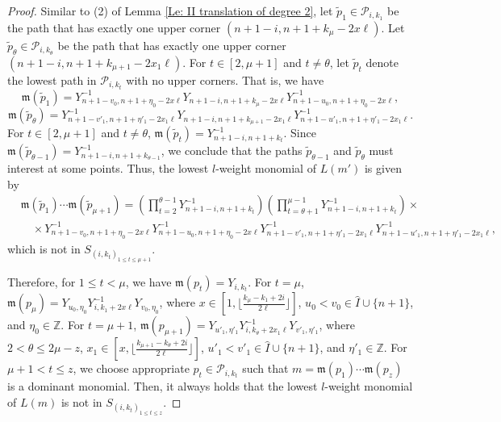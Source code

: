 \documentclass[10pt,a4paper]{amsart}
\begin{document}
\begin{proof}
Similar to (2) of Lemma \ref{Le: II translation of degree 2}, let $\widetilde{p}_1\in \mathscr{P}_{i,k_1}$ be the path that has exactly one upper corner $(n+1-i,n+1+k_{\mu}-2x \ell)$. Let $\widetilde{p}_{\theta}\in \mathscr{P}_{i,k_{\theta}}$ be the path that has exactly one upper corner $(n+1-i,n+1+k_{\mu+1}-2x_1 \ell)$. For $t\in[2, \mu+1]$ and $t\neq \theta$, let $\widetilde{p}_t$ denote the lowest path in $\mathscr{P}_{i,k_t}$ with no upper corners. That is, we have 
\[\mathfrak{m}(\widetilde{p}_{1})=Y_{n+1-v_0,n+1+\eta_0-2x \ell}^{-1}Y_{n+1-i,n+1+k_{\mu}-2x \ell}Y_{n+1-u_0, n+1+\eta_0-2x \ell}^{-1},
\]
\[
\mathfrak{m}(\widetilde{p}_{\theta})=Y_{n+1-v'_1,n+1+\eta'_1-2x_1 \ell}^{-1}Y_{n+1-i,n+1+k_{\mu+1}-2x_1 \ell}Y_{n+1-u'_1, n+1+\eta'_1-2x_1 \ell}^{-1}.
\]
For $t\in[2, \mu+1]$ and $t\neq \theta$, $\mathfrak{m}(\widetilde{p}_{t})=Y_{n+1-i,n+1+k_t}^{-1}$. Since $\mathfrak{m}(\widetilde{p}_{\theta-1})=Y_{n+1-i,n+1+k_{\theta-1}}^{-1}$, we conclude that the paths $\widetilde{p}_{\theta-1}$ and $\widetilde{p}_{\theta}$ must interest at some points. Thus, the lowest $l$-weight monomial of $L(m')$ is given by 
\begin{align*}
& \mathfrak{m}(\widetilde{p}_{1})\cdots \mathfrak{m}(\widetilde{p}_{\mu+1})= \left( \prod_{t=2}^{\theta-1}  Y_{n+1-i,n+1+k_{t}}^{-1} \right)\left( \prod_{t=\theta+1}^{\mu-1}Y_{n+1-i,n+1+k_{t}}^{-1} \right) \times \\
& \quad \times Y_{n+1-v_0,n+1+\eta_0-2x \ell}^{-1} Y_{n+1-u_0,n+1+\eta_0-2x \ell}^{-1}  Y_{n+1-v'_1,n+1+\eta'_1-2x_1 \ell}^{-1}Y_{n+1-u'_1,n+1+\eta'_1-2x _1 \ell}^{-1},
\end{align*}
which is not in $S_{(i,k_t)_{1 \leq t \leq \mu+1}}$.

Therefore, for $1\leq t<\mu$, we have $\mathfrak{m}(p_t)=Y_{i,k_t}$. For $t=\mu$, $\mathfrak{m}(p_{\mu})=Y_{u_0,\eta_0}Y_{i,k_1+2x \ell}^{-1}Y_{v_0,\eta_0}$, where $x\in[1,\lfloor\frac{k_\mu-k_1+2i}{2 \ell}\rfloor]$, $u_0<v_0 \in \hat{I} \cup \{n+1\}$, and $\eta_0\in \mathbb{Z}$. For $t=\mu+1$, $\mathfrak{m}(p_{\mu+1})=Y_{u'_1,\eta'_1} Y_{i,k_\theta+2x_1\ell}^{-1}Y_{v'_1,\eta'_1}$, where $2<\theta \leq 2\mu-z$, $x_1\in [x,\lfloor\frac{k_{\mu+1}-k_\theta+2i}{2 \ell}\rfloor]$, $u'_1<v'_1\in \hat{I} \cup \{n+1\}$, and $\eta'_1\in \mathbb{Z}$. For $\mu+1<t\leq z$, we choose appropriate $p_t\in\mathscr{P}_{i,k_t}$ such that $m=\mathfrak{m}(p_1)\cdots \mathfrak{m}(p_z)$ is a dominant monomial. Then, it always holds that the lowest $l$-weight monomial of $L(m)$ is not in $S_{(i,k_t)_{1 \leq t \leq z}}$.


\end{proof}
\end{document}

